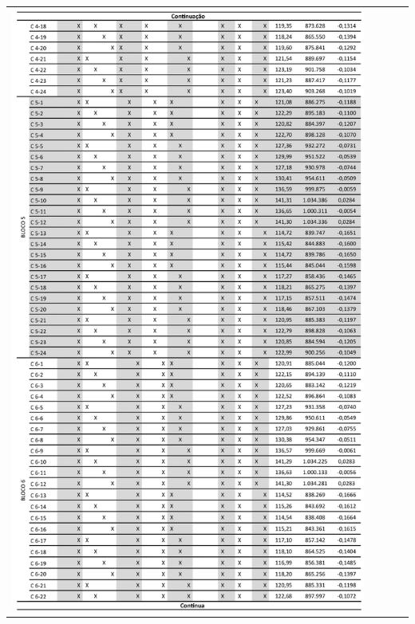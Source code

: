 \begin{table}[H]
    \centering
    \begin{tabular}{l}
        \includegraphics[width=0.9\textwidth]{figures/appendices/tabela02.png}
    \end{tabular}
\end{table}
\pagebreak
